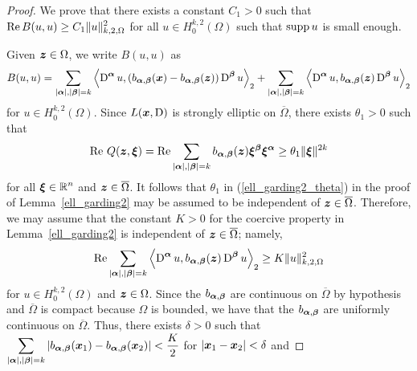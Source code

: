 \begin{proof}
 We prove that there exists a constant $C_1>0$ such that
$\displaystyle \operatorname{Re} B(u,u) \geq C_1 \|u\|_{k,2,\Omega}^2$ for all
$\displaystyle u\in H^{k,2}_0(\Omega)$ such that $\operatorname{supp} u$ is small enough.

Given ${\bm{z}} \in \Omega$, we write $B(u,u)$ as
\begin{equation} \label{ell_garding3_B}
B(u,u) =
\sum_{|{\bm{\alpha}}|,|{\bm{\beta}}|= k}
\left\langle{\operatorname{D}^{{\bm{\alpha}}} u} , {
\left(b_{{\bm{\alpha}},{\bm{\beta}}}({\bm{x}})
-b_{{\bm{\alpha}},{\bm{\beta}}}({\bm{z}})\right)\operatorname{D}^{{\bm{\beta}}} u}\right\rangle_2
+ \sum_{|{\bm{\alpha}}|,|{\bm{\beta}}|= k}
\left\langle{\operatorname{D}^{{\bm{\alpha}}} u} , {b_{{\bm{\alpha}},{\bm{\beta}}}({\bm{z}})
\operatorname{D}^{{\bm{\beta}}} u}\right\rangle_2
\end{equation}
for $\displaystyle u \in H^{k,2}_0(\Omega)$.
Since $L({\bm{x}},\operatorname{D})$ is strongly elliptic on $\overline{\Omega}$,
there exists $\theta_1 >0$ such that
\begin{equation} \label{ell_garding3_theta1}
\operatorname{Re}\, Q({\bm{z}}, {\bm{\xi}}) = \operatorname{Re} \sum_{|{\bm{\alpha}}|,|{\bm{\beta}}|=k}
b_{{\bm{\alpha}},{\bm{\beta}}}({\bm{z}}) {\bm{\xi}}^{{\bm{\beta}}}
{\bm{\xi}}^{{\bm{\alpha}}} \geq \theta_1 \|{\bm{\xi}}\|^{2k}
\end{equation}
for all $\displaystyle {\bm{\xi}} \in \mathbb{R}^n$ and ${\bm{z}}\in \overline{\Omega}$.
It follows that $\theta_1$ in (\ref{ell_garding2_theta}) in
the proof of Lemma~\ref{ell_garding2} may be assumed to be independent of
${\bm{z}} \in \overline{\Omega}$.  Therefore, we may assume that the
constant $K>0$ for the coercive property in Lemma~\ref{ell_garding2}
is independent of ${\bm{z}} \in \overline{\Omega}$; namely,
\begin{equation} \label{ell_garding_local1}
\operatorname{Re} \sum_{|{\bm{\alpha}}|,|{\bm{\beta}}|= k}
\left\langle{\operatorname{D}^{{\bm{\alpha}}} u} , {b_{{\bm{\alpha}},{\bm{\beta}}}({\bm{z}}) \operatorname{D}^{{\bm{\beta}}} u}\right\rangle_2
\geq K \|u\|_{k,2,\Omega}^2
\end{equation}
for $\displaystyle u \in H^{k,2}_0(\Omega)$ and ${\bm{z}} \in \Omega$.
Since the $b_{{\bm{\alpha}},{\bm{\beta}}}$ are continuous on
$\overline{\Omega}$ by hypothesis and $\overline{\Omega}$ is compact
because $\Omega$ is bounded, we have that the
$b_{{\bm{\alpha}},{\bm{\beta}}}$ are uniformly continuous on
$\overline{\Omega}$.  Thus, there exists $\delta >0$ such that
$\displaystyle \sum_{|{\bm{\alpha}}|,|{\bm{\beta}}|= k}
\left|b_{{\bm{\alpha}},{\bm{\beta}}}({\bm{x}}_1)
-b_{{\bm{\alpha}},{\bm{\beta}}}({\bm{x}}_2)\right| < \frac{K}{2}$
for $\displaystyle \left| {\bm{x}}_1- {\bm{x}}_2 \right| < \delta$ and

\end{proof}
